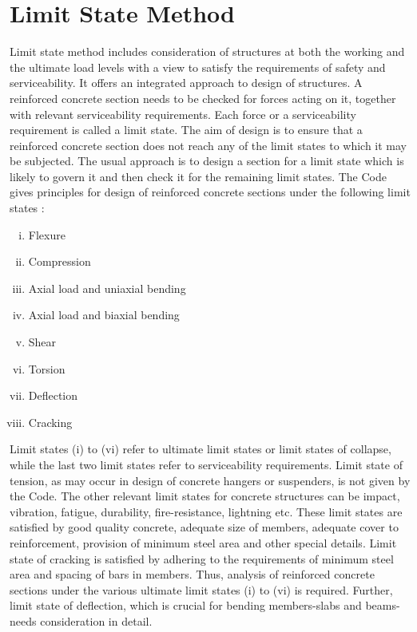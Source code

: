 \section{Limit State Method}

Limit state method includes consideration of structures at both the
working and the ultimate load levels with a view to satisfy the
requirements of safety and serviceability. It offers an integrated
approach to design of structures. A reinforced concrete section needs 
to be checked for forces acting on it, together with relevant serviceability
requirements. Each force or a serviceability requirement is called a 
limit state. The aim of design is to ensure that a reinforced concrete
section does not reach any of the limit states to which it may be subjected.
The usual approach is to design a section for a limit state which is
likely to govern it and then check it for the remaining limit states.
The Code gives principles for design of reinforced concrete sections
under the following limit states : 

\begin{enumerate}[(i)]
\item Flexure
\item Compression
\item Axial load and uniaxial bending
\item Axial load and biaxial bending
\item Shear
\item Torsion
\item Deflection
\item Cracking
\end{enumerate}
Limit states (i) to (vi) refer to ultimate limit states or limit states
of collapse, while the last two limit states refer to serviceability 
requirements. Limit state of tension, as may occur in design of concrete 
hangers or suspenders, is not given by the Code. The other relevant limit
states for concrete structures can be impact, vibration, fatigue,
durability, ﬁre-resistance, lightning etc. These limit states are 
satisfied by good quality concrete, adequate size of members, adequate
cover to reinforcement, provision of minimum steel area and other special
details. Limit state of cracking is satisfied by adhering to the
requirements of minimum steel area and spacing of bars in members. Thus,
analysis of reinforced concrete sections under the various ultimate limit
states (i) to (vi) is required. Further, limit state of deflection, which
is crucial for bending members-slabs and beams-needs consideration in 
detail.

